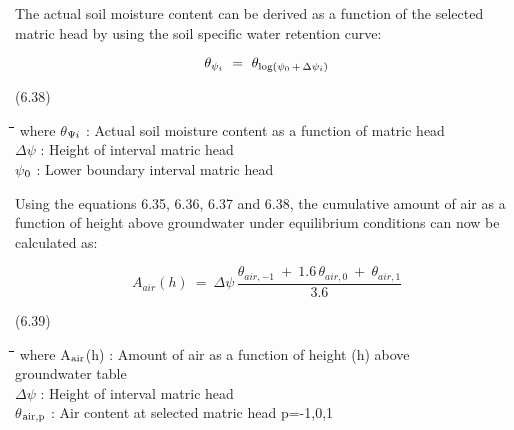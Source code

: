 \documentclass[11pt]{article}
\begin{document}
\bigskip
The actual soil moisture content can be derived as a function of the selected matric head
by using the soil specific water retention curve:

\begin{displaymath}
\theta  _{\psi _{i} } ~=~ \theta  _{{\rm log} (\psi _{0} \, +\, \Delta  \psi _{i} )}
\end{displaymath}

 \bigskip
\strut\hfill (6.38)
\nwln
\begin{tabbing}
\hspace{1.27cm}\=\hspace{1.27cm}\=\hspace{1.27cm}\=\hspace{1.27cm}\=%
\hspace{1.27cm}\=\hspace{1.27cm}\=\hspace{1.27cm}\=\hspace{1.27cm}\=%
\hspace{1.27cm}\=\hspace{1.27cm}\=\kill
where\> $\theta$$_{{\rm \Psi}{i}}$\> : Actual soil moisture content as a function of matric head\> \> \> \> \> \> \> \> [cm$^{{\rm 3}}$ cm$^{{\rm -3}}$]\\
\>$\Delta$$\psi$\> : Height of interval matric head\> \> \> \> \> \> \> \> [cm]\\
\>$\psi$$_{{\rm 0}}$\> : Lower boundary interval matric head\> \> \> \> \> \> \> \> [cm]
\end{tabbing}

\bigskip
\bigskip
Using the equations 6.35, 6.36, 6.37 and 6.38, the cumulative amount of air as a function
of height above groundwater under equilibri\-um conditions can now be calculated as: 

\begin{displaymath}
A _{air} (h) ~=~\Delta  \psi \,{\frac{ \theta  _{air, -1} ~+~ 1.6\, \theta  _{air,0} ~+~ \theta  _{air,1} }{3.6}}
\end{displaymath}

 \bigskip
\strut\hfill (6.39)

\nwln
\begin{tabbing}
\hspace{1.27cm}\=\hspace{1.27cm}\=\hspace{1.27cm}\=\hspace{1.27cm}\=%
\hspace{1.27cm}\=\hspace{1.27cm}\=\hspace{1.27cm}\=\hspace{1.27cm}\=%
\hspace{1.27cm}\=\hspace{1.27cm}\=\kill
where\> A$_{{\rm air}}$(h)\> : Amount of air as a function of height (h) above\\
\>\>   groundwater table \> \> \> \> \> \> \> \> [cm]\\
\>$\Delta$$\psi$\> : Height of interval matric head\> \> \> \> \> \> \> \> [cm]\\
\>$\theta$$_{{\rm air,p}}$\> : Air content at selected matric head p=-1,0,1\> \> \> \> \> \> \> \> [cm$^{{\rm 3}}$ cm$^{{\rm -3}}$]
\end{tabbing}
\end{document}
